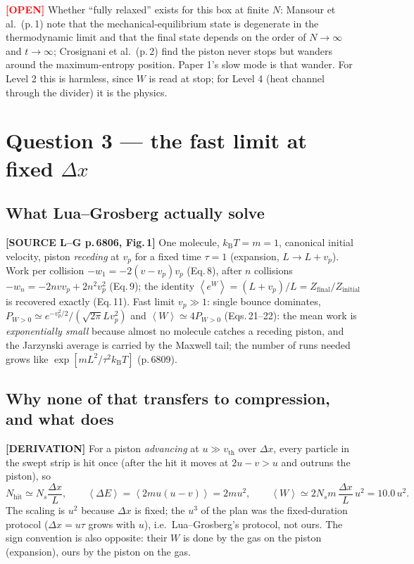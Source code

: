 \documentclass[11pt,a4paper]{article}
\newcommand{\kT}{k_{\mathrm B}T}
\newcommand{\avg}[1]{\left\langle #1 \right\rangle}
\newcommand{\src}[1]{\textcolor{OliveGreen}{\textbf{[SOURCE #1]}}}
\newcommand{\der}{\textcolor{NavyBlue}{\textbf{[DERIVATION]}}}
\newcommand{\opn}{\textcolor{Red}{\textbf{[OPEN]}}}
\begin{document}
\opn{} Whether ``fully relaxed'' exists for this box at finite $N$: Mansour et al.\ (p.\,1) note that the mechanical-equilibrium state is degenerate in the thermodynamic limit and that the final state depends on the order of $N \to \infty$ and $t \to \infty$; Crosignani et al.\ (p.\,2) find the piston never stops but wanders around the maximum-entropy position. Paper 1's slow mode is that wander. For Level 2 this is harmless, since $W$ is read at stop; for Level 4 (heat channel through the divider) it is the physics.

\section{Question 3 --- the fast limit at fixed $\Delta x$}

\subsection{What Lua--Grosberg actually solve}
\src{L--G p.\,6806, Fig.\,1} One molecule, $\kT = m = 1$, canonical initial velocity, piston \emph{receding} at $v_p$ for a fixed time $\tau = 1$ (expansion, $L \to L + v_p$). Work per collision $-w_1 = -2(v - v_p)v_p$ (Eq.\,8), after $n$ collisions $-w_n = -2nvv_p + 2n^2v_p^2$ (Eq.\,9); the identity $\avg{e^{W}} = (L+v_p)/L = Z_{\mathrm{final}}/Z_{\mathrm{initial}}$ is recovered exactly (Eq.\,11). Fast limit $v_p \gg 1$: single bounce dominates, $P_{W>0} \simeq e^{-v_p^2/2}/(\sqrt{2\pi}Lv_p^2)$ and $\avg W \simeq 4P_{W>0}$ (Eqs.\,21--22): the mean work is \emph{exponentially small} because almost no molecule catches a receding piston, and the Jarzynski average is carried by the Maxwell tail; the number of runs needed grows like $\exp[mL^2/\tau^2\kT]$ (p.\,6809).

\subsection{Why none of that transfers to compression, and what does}
\der{} For a piston \emph{advancing} at $u \gg v_{\mathrm{th}}$ over $\Delta x$, every particle in the swept strip is hit once (after the hit it moves at $2u - v > u$ and outruns the piston), so
\begin{equation}
N_{\mathrm{hit}} \simeq N_s\frac{\Delta x}{L},\qquad
\avg{\Delta E} = \avg{2mu(u - v)} = 2mu^2,\qquad
\avg{W} \simeq 2N_s m\,\frac{\Delta x}{L}\,u^2 = 10.0\,u^2 .
\label{eq:fast}
\end{equation}
The scaling is $u^2$ because $\Delta x$ is fixed; the $u^3$ of the plan was the fixed-duration protocol ($\Delta x = u\tau$ grows with $u$), i.e.\ Lua--Grosberg's protocol, not ours. The sign convention is also opposite: their $W$ is done by the gas on the piston (expansion), ours by the piston on the gas.
\end{document}
